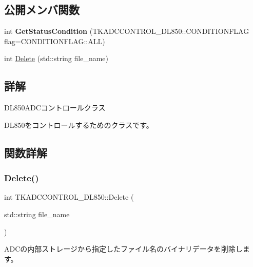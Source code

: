 \subsection*{公開メンバ関数}
\begin{DoxyCompactItemize}
\item 
\mbox{\label{class_t_k_a_d_c_c_o_n_t_r_o_l___d_l850_aecc88bc7f7ae5b93e578f711ce653e0f}} 
int {\bfseries Get\+Status\+Condition} (T\+K\+A\+D\+C\+C\+O\+N\+T\+R\+O\+L\+\_\+\+D\+L850\+::\+C\+O\+N\+D\+I\+T\+I\+O\+N\+F\+L\+AG flag=C\+O\+N\+D\+I\+T\+I\+O\+N\+F\+L\+A\+G\+::\+A\+LL)
\item 
int \hyperlink{class_t_k_a_d_c_c_o_n_t_r_o_l___d_l850_acef79a34544e50a51bab03b83652306a}{Delete} (std\+::string file\+\_\+name)
\end{DoxyCompactItemize}


\subsection{詳解}
D\+L850\+A\+D\+Cコントロールクラス

D\+L850をコントロールするためのクラスです。 

\subsection{関数詳解}
\mbox{\label{class_t_k_a_d_c_c_o_n_t_r_o_l___d_l850_acef79a34544e50a51bab03b83652306a}} 
\subsubsection{\texorpdfstring{Delete()}{Delete()}}
{\footnotesize\ttfamily int T\+K\+A\+D\+C\+C\+O\+N\+T\+R\+O\+L\+\_\+\+D\+L850\+::\+Delete (\begin{DoxyParamCaption}\item[{std\+::string}]{file\+\_\+name }\end{DoxyParamCaption})\hspace{0.3cm}{\ttfamily [virtual]}}

A\+D\+Cの内部ストレージから指定したファイル名のバイナリデータを削除します。

